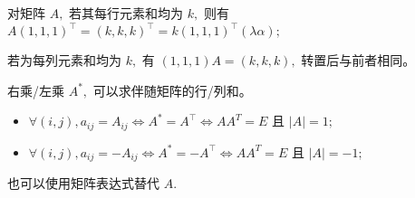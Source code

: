
对矩阵 $ A, $ 若其每行元素和均为 $ k, $ 则有 $ A(1,1,1)^\top = (k,k,k)^\top = k(1,1,1)^\top(\lambda \alpha); $

若为每列元素和均为 $ k, $ 有 $ (1,1,1)A = (k,k,k), $ 转置后与前者相同。

右乘/左乘 $ A^*, $ 可以求伴随矩阵的行/列和。


\begin{itemize}
    \item $ \forall (i,j), a_{ij} = A_{ij} \Leftrightarrow A^* = A^\top \Leftrightarrow AA^T = E $
    且 $ |A| = 1; $ 
    \item $ \forall (i,j), a_{ij} = -A_{ij} \Leftrightarrow A^* = -A^\top \Leftrightarrow AA^T = E $
    且 $ |A| = -1; $ 
\end{itemize}

也可以使用矩阵表达式替代 $ A. $


